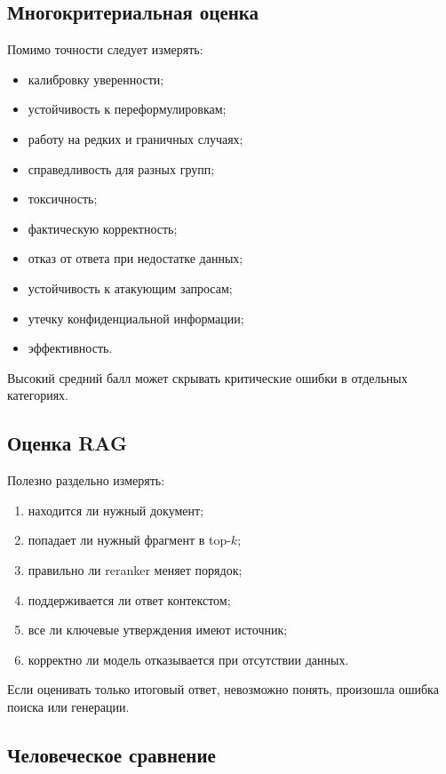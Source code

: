 \documentclass[12pt,a4paper]{article}
\newcommand{\1}{\mathbf{1}}
\theoremstyle{definition}
\theoremstyle{remark}
\begin{document}
\subsection{Многокритериальная оценка}

Помимо точности следует измерять:

\begin{itemize}
    \item калибровку уверенности;
    \item устойчивость к переформулировкам;
    \item работу на редких и граничных случаях;
    \item справедливость для разных групп;
    \item токсичность;
    \item фактическую корректность;
    \item отказ от ответа при недостатке данных;
    \item устойчивость к атакующим запросам;
    \item утечку конфиденциальной информации;
    \item эффективность.
\end{itemize}

Высокий средний балл может скрывать критические ошибки в отдельных
категориях.

\subsection{Оценка RAG}

Полезно раздельно измерять:

\begin{enumerate}
    \item находится ли нужный документ;
    \item попадает ли нужный фрагмент в top-$k$;
    \item правильно ли reranker меняет порядок;
    \item поддерживается ли ответ контекстом;
    \item все ли ключевые утверждения имеют источник;
    \item корректно ли модель отказывается при отсутствии данных.
\end{enumerate}

Если оценивать только итоговый ответ, невозможно понять, произошла ошибка
поиска или генерации.

\subsection{Человеческое сравнение}
\end{document}
